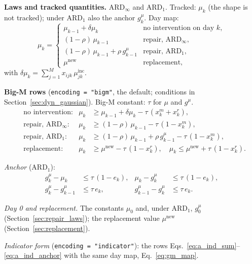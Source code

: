 \documentclass[11pt,a4paper]{article}
\theoremstyle{plain}
\theoremstyle{definition}
\newcommand{\ARDinf}{\mathrm{ARD}_{\infty}}
\newcommand{\ARDone}{\mathrm{ARD}_{1}}
\newcommand{\inc}{\mathrm{inc}}
\newcommand{\new}{\mathrm{new}}
\renewcommand{\_}{\textunderscore\allowbreak{}}
\begin{document}
\textbf{Laws and tracked quantities.} $\ARDinf$ and $\ARDone$. Tracked: $\mu_k$
(the shape is not tracked); under $\ARDone$ also the anchor $g^{\mu}_k$. Day map:
\begin{equation}
  \mu_k = \begin{cases}
    \mu_{k-1} + \delta\mu_k & \text{no intervention on day } k,\\
    (1-\rho)\,\mu_{k-1} & \text{repair, } \ARDinf,\\
    (1-\rho)\,\mu_{k-1} + \rho\, g^{\mu}_{k-1} & \text{repair, } \ARDone,\\
    \mu^{\new} & \text{replacement,}
  \end{cases}
  \label{eq:gm_map}
\end{equation}
with $\delta\mu_k = \sum_{j=1}^{M} x_{ijk}\,\mu^{\inc}_{jk}$.

\textbf{Big-M rows} (\texttt{encoding = "bigm"}, the default; conditions in
Section~\ref{sec:dyn_gaussian}). Big-M constant: $\tau$ for $\mu$ and $g^{\mu}$.
\begin{align}
  &\text{no intervention:} & \mu_k &\geq \mu_{k-1} + \delta\mu_k - \tau\,(x^m_k + x^r_k),
    \label{eq:gm_mu_carry} \\
  &\text{repair, } \ARDinf\text{:} & \mu_k &\geq (1-\rho)\,\mu_{k-1} - \tau\,(1 - x^m_k),
    \label{eq:gm_mu_inf} \\
  &\text{repair, } \ARDone\text{:} & \mu_k &\geq (1-\rho)\,\mu_{k-1} + \rho\, g^{\mu}_{k-1}
    - \tau\,(1 - x^m_k),
    \label{eq:gm_mu_one} \\
  &\text{replacement:} & \mu_k &\geq \mu^{\new} - \tau\,(1 - x^r_k), \quad
    \mu_k \leq \mu^{\new} + \tau\,(1 - x^r_k).
    \label{eq:gm_mu_repl}
\end{align}

\emph{Anchor} ($\ARDone$):
\begin{align}
  g^{\mu}_k - \mu_k &\leq \tau\,(1 - e_k), & \mu_k - g^{\mu}_k &\leq \tau\,(1 - e_k),
    \label{eq:gm_anchor_set} \\
  g^{\mu}_k - g^{\mu}_{k-1} &\leq \tau\, e_k, & g^{\mu}_{k-1} - g^{\mu}_k &\leq \tau\, e_k.
    \label{eq:gm_anchor_keep}
\end{align}

\emph{Day 0 and replacement.} The constants $\mu_0$ and, under $\ARDone$, $g^{\mu}_0$
(Section~\ref{sec:repair_laws}); the replacement value $\mu^{\new}$
(Section~\ref{sec:replacement}).

\emph{Indicator form} (\texttt{encoding = "indicator"}): the rows
Eqs.~\eqref{eq:a_ind_sum}--\eqref{eq:a_ind_anchor} with the same day map,
Eq.~\eqref{eq:gm_map}.
\end{document}
